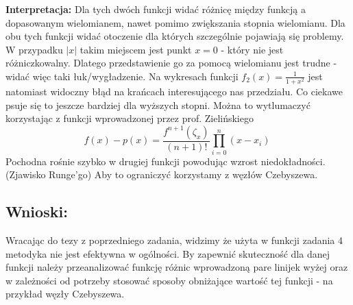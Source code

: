 \documentclass[11pt, a4paper]{article}
\begin{document}
	\textbf{Interpretacja:} Dla tych dwóch funkcji widać różnicę między funkcją a dopasowanym wielomianem, nawet pomimo zwiększania stopnia wielomianu.
	\newline
	Dla obu tych funkcji widać otoczenie dla których szczególnie pojawiają się problemy.
	W przypadku $|x|$ takim miejscem jest punkt $x=0$ - który nie jest różniczkowalny. Dlatego przedstawienie go za pomocą wielomianu jest trudne - widać więc taki łuk/wygładzenie.
	\newline
	Na wykresach funkcji $f_2(x) = \frac{1}{1+x^2}$ jest natomiast widoczny błąd na krańcach interesującego nas przedziału. Co ciekawe psuje się to jeszcze bardziej dla wyższych stopni.
	Można to wytlumaczyć korzystając z funkcji wprowadzonej przez prof. Zielińskiego
	\begin{equation}
		f(x)-p(x) = \frac{f^{n+1}(\zeta_x)}{(n+1)!} \prod_{i=0}^{n} (x - x_i) \
	\end{equation}
	Pochodna rośnie szybko w drugiej funkcji powodując wzrost niedokładności. (Zjawisko Runge'go)
	Aby to ograniczyć korzystamy z węzłów Czebyszewa.
\subsection{Wnioski:}
Wracając do tezy z poprzedniego zadania, widzimy że użyta w funkcji zadania 4 metodyka nie jest efektywna w ogólności.
By zapewnić skuteczność dla danej funkcji należy przeanalizować funkcję różnic wprowadzoną pare linijek wyżej oraz w zależności od potrzeby stosować sposoby obniżające wartość tej funkcji - na przykład węzły Czebyszewa.

	
\end{document}

